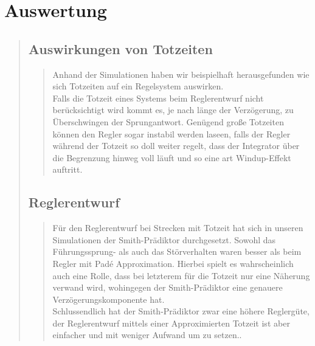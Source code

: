 

\section{Auswertung}
\begin{quote}
    
    \subsection{Auswirkungen von Totzeiten}
    \begin{quote}
        
        Anhand der Simulationen haben wir beispielhaft herausgefunden wie sich Totzeiten auf ein Regelsystem
        auswirken.\\
        Falls die Totzeit eines Systems beim Reglerentwurf nicht berücksichtigt wird kommt es, je nach länge der
        Verzögerung, zu Überschwingen der Sprungantwort. Genügend große Totzeiten können den Regler sogar instabil
        werden laseen, falls der Regler während der Totzeit so doll weiter regelt, dass der Integrator über die
        Begrenzung hinweg voll läuft und so eine art Windup-Effekt auftritt.\\ 
        
    \end{quote} %
    
    
    \subsection{Reglerentwurf}
    \begin{quote}
        
        Für den Reglerentwurf bei Strecken mit Totzeit hat sich in unseren Simulationen der Smith-Prädiktor
        durchgesetzt. Sowohl das Führungssprung- als auch das Störverhalten waren besser als beim Regler mit Pad\'e
        Approximation. Hierbei spielt es wahrscheinlich auch eine Rolle, dass bei letzterem für die Totzeit nur eine
        Näherung verwand wird, wohingegen der Smith-Prädiktor eine genauere Verzögerungs\-komponente hat.\\
        Schlussendlich hat der Smith-Prädiktor zwar eine höhere Reglergüte, der Reglerentwurf mittels einer
        Approximierten Totzeit ist aber einfacher und mit weniger Aufwand um zu setzen..\\
        
    \end{quote} %
    \vspace{1em}
    
    
    
\end{quote} %

